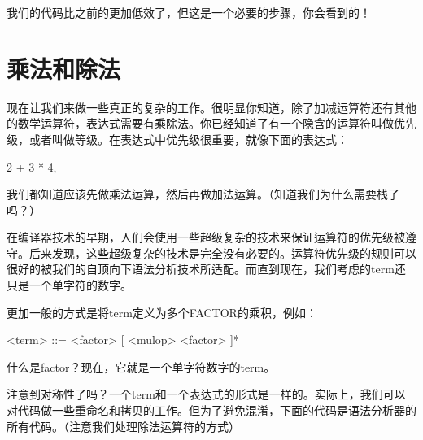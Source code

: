 我们的代码比之前的更加低效了，但这是一个必要的步骤，你会看到的！

\section{乘法和除法}

现在让我们来做一些真正的复杂的工作。很明显你知道，除了加减运算符还有其他的数学运算符，表达式需要有乘除法。你已经知道了有一个隐含的运算符叫做优先级，或者叫做等级。在表达式中优先级很重要，就像下面的表达式：

\begin{tcolorbox}
2 + 3 * 4,
\end{tcolorbox}

我们都知道应该先做乘法运算，然后再做加法运算。（知道我们为什么需要栈了吗？）

在编译器技术的早期，人们会使用一些超级复杂的技术来保证运算符的优先级被遵守。后来发现，这些超级复杂的技术是完全没有必要的。运算符优先级的规则可以很好的被我们的自顶向下语法分析技术所适配。而直到现在，我们考虑的term还只是一个单字符的数字。

更加一般的方式是将term定义为多个FACTOR的乘积，例如：

\begin{tcolorbox}
<term> ::= <factor>  [ <mulop> <factor> ]*
\end{tcolorbox}

什么是factor？现在，它就是一个单字符数字的term。

注意到对称性了吗？一个term和一个表达式的形式是一样的。实际上，我们可以对代码做一些重命名和拷贝的工作。但为了避免混淆，下面的代码是语法分析器的所有代码。（注意我们处理除法运算符的方式）

